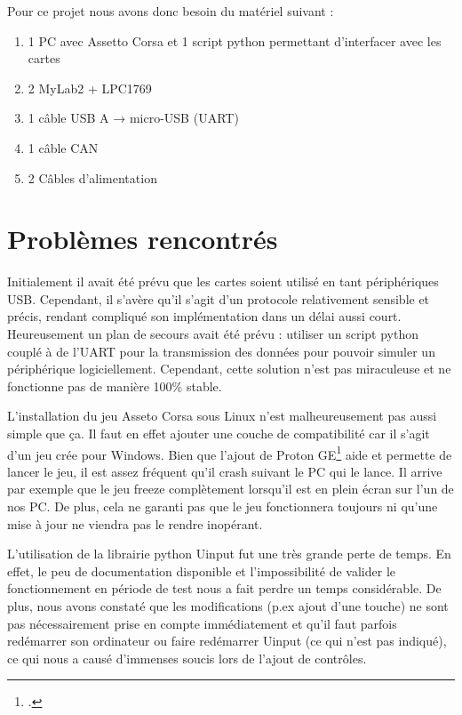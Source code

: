 \documentclass[french, 11pt]{article}
\begin{document}
        Pour ce projet nous avons donc besoin du matériel suivant :

        \begin{enumerate}
            \item 1 PC avec Assetto Corsa et 1 script python permettant d'interfacer avec les cartes
            \item 2 MyLab2 + LPC1769
            \item 1 câble USB A → micro-USB (UART)
            \item 1 câble CAN
            \item 2 Câbles d'alimentation
        \end{enumerate}


	\section{Problèmes rencontrés}

	Initialement il avait été prévu que les cartes soient utilisé en tant périphériques USB. Cependant, il s'avère qu'il s'agit d'un protocole relativement sensible et précis, rendant compliqué son implémentation dans un délai aussi court. Heureusement un plan de secours avait été prévu : utiliser un script python couplé à de l'UART pour la transmission des données pour pouvoir simuler un périphérique logiciellement. Cependant, cette solution n'est pas miraculeuse et ne fonctionne pas de manière 100\% stable.


	L'installation du jeu Asseto Corsa sous Linux n'est malheureusement pas aussi simple que ça. Il faut en effet ajouter une couche de compatibilité car il s'agit d'un jeu crée pour Windows. Bien que l'ajout de Proton GE\footcite{proton_ge} aide et permette de lancer le jeu, il est assez fréquent qu'il crash suivant le PC qui le lance. Il arrive par exemple que le jeu freeze complètement lorsqu'il est en plein écran sur l'un de nos PC. De plus, cela ne garanti pas que le jeu fonctionnera toujours ni qu'une mise à jour ne viendra pas le rendre inopérant.


	L'utilisation de la librairie python Uinput fut une très grande perte de temps. En effet, le peu de documentation disponible et l'impossibilité de valider le fonctionnement en période de test nous a fait perdre un temps considérable. De plus, nous avons constaté que les modifications (p.ex ajout d'une touche) ne sont pas nécessairement prise en compte immédiatement et qu'il faut parfois redémarrer son ordinateur ou faire redémarrer Uinput (ce qui n'est pas indiqué), ce qui nous a causé d'immenses soucis lors de l'ajout de contrôles.
\end{document}
